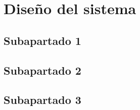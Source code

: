 \vspace*{-1cm}
\section{Diseño del sistema}
\label{sec:diseno}

\lipsum[1-7]

\subsection{Subapartado 1}
\lipsum[1]
\subsection{Subapartado 2}
\lipsum[1-3]
\subsection{Subapartado 3}
\lipsum[1]